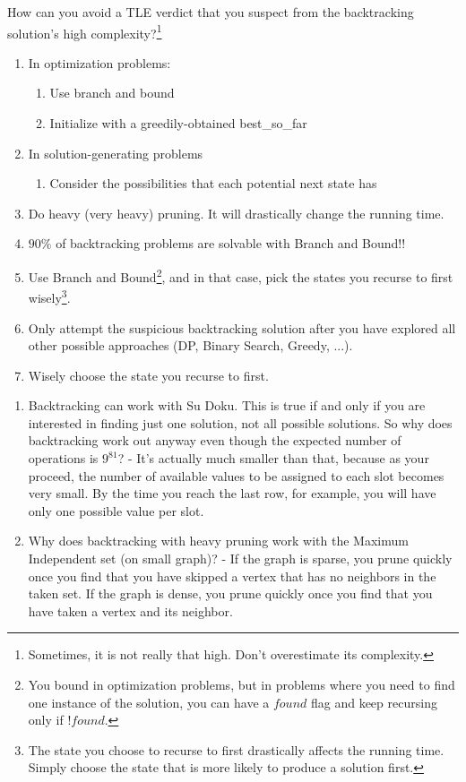 \documentclass[12pt]{book}
\begin{document}
How can you avoid a TLE verdict that you suspect from the backtracking solution's high complexity?\footnote{Sometimes, it is not really that high. Don't overestimate its complexity.}
\begin{enumerate}[label = \roman*.]
\item In optimization problems:
\begin{enumerate}
\item Use branch and bound
\item Initialize with a greedily-obtained best\_so\_far
\end{enumerate}
\item 
In solution-generating problems
\begin{enumerate}
\item Consider the possibilities that each potential next state has
\end{enumerate}
\item Do heavy (very heavy) pruning. It will drastically change the running time.
\item $90\%$ of backtracking problems are solvable with Branch and Bound!!
\item Use Branch and Bound\footnote{You bound in optimization problems, but in problems where you need to find one instance of the solution, you can have a $found$ flag and keep recursing only if $!found$.}, and in that case, pick the states you recurse to first wisely\footnote{The state you choose to recurse to first drastically affects the running time. Simply choose the state that is more likely to produce a solution first.}.
\item Only attempt the suspicious backtracking solution after you have explored all other possible approaches (DP, Binary Search, Greedy, ...).
\item Wisely choose the state you recurse to first.
\end{enumerate}
\begin{enumerate}
\item Backtracking can work with Su Doku. This is true if and only if you are interested in finding just one solution, not all possible solutions. So why does backtracking work out anyway even though the expected number of operations is $9^{81}$? - It's actually much smaller than that, because as your proceed, the number of available values to be assigned to each slot becomes very small. By the time you reach the last row, for example, you will have only one possible value per slot.
\item Why does backtracking with heavy pruning work with the Maximum Independent set (on small graph)? - If the graph is sparse, you prune quickly once you find that you have skipped a vertex that has no neighbors in the taken set. If the graph is dense, you prune quickly once you find that you have taken a vertex and its neighbor.
\end{enumerate}
\end{document}
